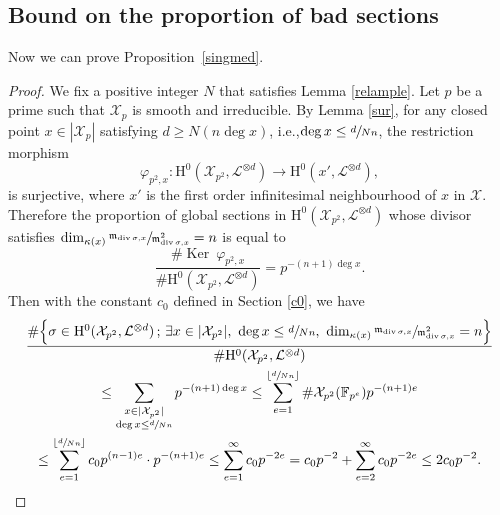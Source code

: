\documentclass[11pt]{article}
\newcommand{\ie}{i.e.,\xspace}
\numberwithin{equation}{section}
\newcommand{\sep}{\,;\,}
\theoremstyle{plain}
\theoremstyle{definition}
\newcommand{\ho}{\mathrm{H}}
\newcommand{\X}{\mathcal{X}}
\newcommand{\li}{\mathcal{L}}
\newcommand{\F}{\mathbb{F}}
\DeclareMathOperator{\Ker}{Ker}
\begin{document}
\subsection{Bound on the proportion of bad sections}
Now we can prove Proposition~\ref{singmed}.

\begin{proof}
We fix a positive integer $N$ that satisfies Lemma \ref{relample}. Let $p$ be a prime such that $\X_p$ is smooth and irreducible. By Lemma \ref{sur}, for any closed point $x\in |\X_{p}|$ satisfying $d\geq N(n\deg x)$, \ie $\deg x\leq \sfrac{d}{Nn}$, the restriction morphism
\[
\varphi_{p^2,x}: \ho^0(\X_{p^2}, \li^{\otimes d})\to \ho^0(x', \li^{\otimes d}),
\]
is surjective, where $x'$ is the first order infinitesimal neighbourhood of $x$ in $\X$. Therefore the proportion of global sections in $\ho^0(\X_{p^2}, \li^{\otimes d})$ whose divisor satisfies $\dim_{\kappa(x)}\sfrac{\mathfrak{m}_{\operatorname{div} \sigma,x}}{\mathfrak{m}_{\operatorname{div} \sigma,x}^2}=n$ is equal to
\[
\frac{\#\Ker\ \varphi_{p^2,x}}{\#\ho^0(\X_{p^2}, \li^{\otimes d})}=p^{-(n+1)\deg x}.
\]
Then with the constant $c_0$ defined in Section \ref{c0}, we have
\begin{multline*}
\frac{\#\Bigl\{ \sigma\in \ho^0(\X_{p^2}, \li^{\otimes d})\sep \exists x\in |\X_{p^2}|,\ \deg x\leq \sfrac{d}{Nn},\ \dim_{\kappa(x)}\sfrac{\mathfrak{m}_{\div \sigma,x}}{\mathfrak{m}_{\div \sigma,x}^2}=n \Bigr\} }{\#\ho^0(\X_{p^2}, \li^{\otimes d})}\\
\leq \sum_{\substack{x\in |\X_{p^2}|\\ \deg x\leq \sfrac{d}{Nn}}}p^{-(n+1)\deg x}\leq \sum_{e=1}^{\lfloor \sfrac{d}{Nn} \rfloor}\#\X_{p^2}(\F_{p^e}) p^{-(n+1)e} \\
\leq \sum_{e=1}^{\lfloor \sfrac{d}{Nn} \rfloor} c_0p^{(n-1)e}\cdot p^{-(n+1)e}
\leq \sum_{e=1}^{\infty} c_0 p^{-2e}= c_0p^{-2}+\sum_{e=2}^{\infty} c_0 p^{-2e}\leq 2c_0p^{-2}.
\end{multline*}


\end{proof}
\end{document}
